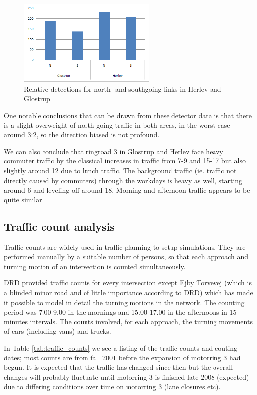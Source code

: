 \begin{figure}[htbp]
\centering
\includegraphics[width=0.6\textwidth]{detector_directions.png}
\caption{Relative detections for north- and southgoing links in Herlev and Glostrup}
\label{fig:detector_directions}
\end{figure}

One notable conclusions that can be drawn from these detector data is that there is a slight overweight of north-going traffic in both areas, in the worst case around 3:2, so the direction biased is not profound.

We can also conclude that ringroad 3 in Glostrup and Herlev face heavy commuter traffic by the classical increases in traffic from 7-9 and 15-17 but also slightly around 12 due to lunch traffic. The background traffic (ie. traffic not directly caused by commuters) through the workdays is heavy as well, starting around 6 and leveling off around 18. Morning and afternoon traffic appears to be quite similar.

\subsection{Traffic count analysis}
\label{traffic_count_analysis}

Traffic counts are widely used in traffic planning to setup simulations. They are performed manually by a suitable number of persons, so that each approach and turning motion of an intersection is counted simultaneously.

DRD provided traffic counts for every intersection except Ejby Torvevej (which is a blinded minor road and of little importance according to DRD) which has made it possible to model in detail the turning motions in the network.
The counting period was 7.00-9.00 in the mornings and 15.00-17.00 in the afternoons in 15-minutes intervals. The counts involved, for each approach, the turning movements of cars (including vans) and trucks. 

In Table \ref{tab:traffic_counts} we see a listing of the traffic counts and couting dates; most counts are from fall 2001 before the expansion of motorring 3 had begun. It is expected that the traffic has changed since then but the overall changes will probably fluctuate until motorring 3 is finished late 2008 (expected) due to differing conditions over time on motorring 3 (lane closures etc).

